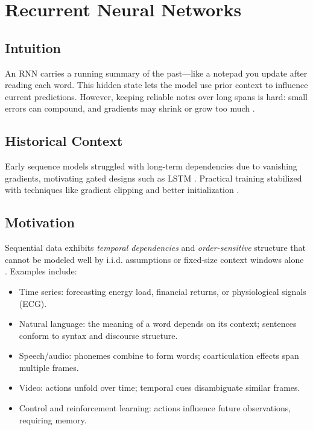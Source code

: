 
\section{Recurrent Neural Networks}
\label{sec:rnns}

\subsection*{Intuition}

An RNN carries a running summary of the past—like a notepad you update after reading each word. This hidden state lets the model use prior context to influence current predictions. However, keeping reliable notes over long spans is hard: small errors can compound, and gradients may shrink or grow too much \cite{GoodfellowEtAl2016}.

\subsection*{Historical Context}

Early sequence models struggled with long-term dependencies due to vanishing gradients, motivating gated designs such as LSTM \cite{Hochreiter1997}. Practical training stabilized with techniques like gradient clipping and better initialization \cite{GoodfellowEtAl2016}.


\subsection{Motivation}

Sequential data exhibits \emph{temporal dependencies} and \emph{order-sensitive} structure that cannot be modeled well by i.i.d. assumptions or fixed-size context windows alone \cite{GoodfellowEtAl2016,Prince2023,Bishop2006}. Examples include:
\begin{itemize}
    \item Time series: forecasting energy load, financial returns, or physiological signals (ECG).
    \item Natural language: the meaning of a word depends on its context; sentences conform to syntax and discourse structure.
    \item Speech/audio: phonemes combine to form words; coarticulation effects span multiple frames.
    \item Video: actions unfold over time; temporal cues disambiguate similar frames.
    \item Control and reinforcement learning: actions influence future observations, requiring memory.
\end{itemize}

